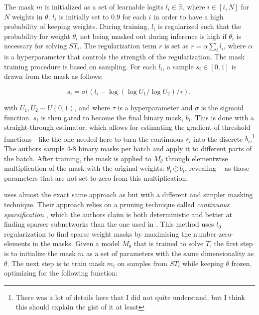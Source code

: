 \documentclass[11pt]{article}
\DeclareMathOperator*{\subnetwork}{\hat{\theta}}
\begin{document}
The mask $m$ is initialized as a set of learnable logits $l_i \in \mathbb{R}$, where $i \in [i, N]$ for $N$ weights in $\theta$. $l_i$ is initially set to $0.9$ for each $i$ in order to have a high probability of keeping weights. During training, $l_i$ is regularized such that the probability for weight $\theta_i$ not being masked out during inference is high if $\theta_i$ is necessary for solving $ST_i$. The regularization term $r$ is set as $r = \alpha \sum_i l_i$, where $\alpha$ is a hyperparameter that controls the strength of the regularization. The mask training procedure is based on sampling. For each $l_i$, a sample $s_i \in [0, 1]$ is drawn from the mask as follows:

\begin{equation}
s_i = \sigma((l_i - \log(\log U_1 / \log U_2) / \tau),
\end{equation}

with $U_1, U_2 \sim U(0,1)$, and where $\tau$ is a hyperparameter and $\sigma$ is the sigmoid function. $s_i$ is then gated to become the final binary mask, $b_i$. This is done with a straight-through estimator, which allows for estimating the gradient of threshold functions---like the one needed here to turn the continuous $s_i$ into the discrete $b_i$.\footnote{There was a lot of details here that I did not quite understand, but I think this should explain the gist of it at least} The authors sample 4-8 binary masks per batch and apply it to different parts of the batch. After training, the mask is applied to $M_\theta$ through elementwise multiplication of the mask with the original weights: $\theta_i \odot b_i$, revealing $\subnetwork$ as those parameters that are not set to zero from this multiplication.

\citet{lepori2023break} uses almost the exact same approach as \citet{csordas2020neural} but with a different and simpler masking technique. Their approach relies on a pruning technique called \textit{continuous sparsification} \citep{savarese2020winning}, which the authors claim is both deterministic and better at finding sparser subnetworks than the one used in \citet{csordas2020neural}. This method uses $l_0$ regularization \citep{louizos2018learning} to find sparse weight masks by maximising the number zero-elements in the masks. Given a model $M_\theta$ that is trained to solve $T$, the first step is to initialize the mask $m$ as a set of parameters with the same dimensionality as $\theta$. The next step is to train mask $m_i$ on samples from $ST_i$ while keeping $\theta$ frozen, optimizing for the following function:
\end{document}
